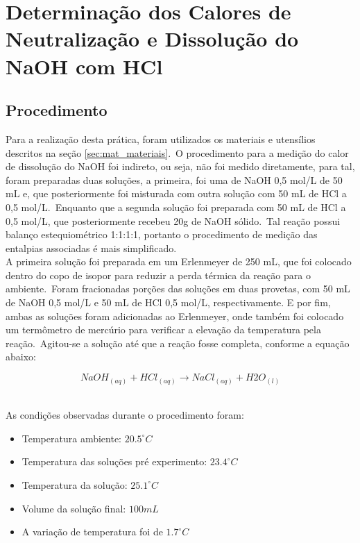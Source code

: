 \section[Parte Experimental]{Determinação dos Calores de Neutralização e Dissolução do NaOH com HCl}\label{sec:parte_experimental}
    \subsection{Procedimento}\label{sec:procedimento}

        \indent Para a realização desta prática, foram utilizados os materiais e utensílios descritos na seção \ref{sec:mat_materiais}.\ O procedimento para a medição do calor de dissolução do NaOH foi indireto, ou seja, não foi medido diretamente, para tal, foram preparadas duas soluções, a primeira, foi uma de NaOH 0,5 mol/L de 50 mL e, que posteriormente foi misturada com outra solução com 50 mL de HCl a 0,5 mol/L.\ Enquanto que a segunda solução foi preparada com 50 mL de HCl a 0,5 mol/L, que posteriormente recebeu 20g de NaOH sólido.\ Tal reação possui balanço estequiométrico 1:1:1:1, portanto o procedimento de medição das entalpias associadas é mais simplificado.\\
        
        \indent A primeira solução foi preparada em um Erlenmeyer de 250 mL, que foi colocado dentro do copo de isopor para reduzir a perda térmica da reação para o ambiente.\ Foram fracionadas porções das soluções em duas provetas, com 50 mL de NaOH 0,5 mol/L e 50 mL de HCl 0,5 mol/L, respectivamente. E por fim, ambas as soluções foram adicionadas ao Erlenmeyer, onde também foi colocado um termômetro de mercúrio para verificar a elevação da temperatura pela reação.\ Agitou-se a solução até que a reação fosse completa, conforme a equação abaixo:\
        
        \begin{equation}
            NaOH_{(aq)} + HCl_{(aq)} \rightarrow NaCl_{(aq)} + H2O_{(l)} \label{eq:equação_principal_aquosa}
        \end{equation}\
   
    	\indent As condições observadas durante o procedimento foram:
    	\begin{itemize}
    		\item Temperatura ambiente: $20.5^{\circ}C$ 
    		\item Temperatura das soluções pré experimento:  $23.4^{\circ}C$
    		\item Temperatura da solução: $25.1^{\circ}C$
            \item Volume da solução final: $100 mL$
            \item A variação de temperatura foi de ${1.7}^{\circ}C$
    	\end{itemize}

